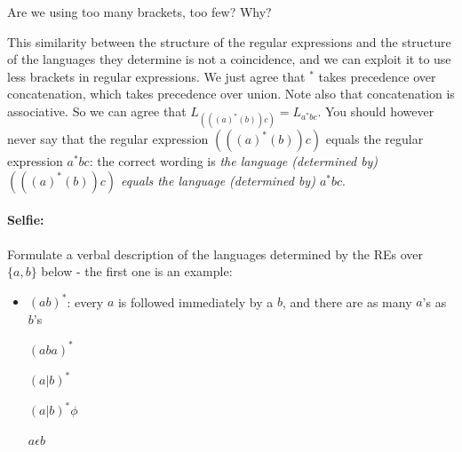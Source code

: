 Are we using too many brackets, too few? Why?




This similarity between the structure of the regular expressions and
the structure of the languages they determine is not a coincidence,
and we can exploit it to use less brackets in regular expressions. We
just agree that $^*$ takes precedence over concatenation, which takes
precedence over union. Note also that concatenation is associative. So
we can agree that $L_{(((a)^*(b))c)} = L_{a^*bc}$. You should however
never say that the regular expression $(((a)^*(b))c)$ equals the
regular expression $a^*bc$: the correct wording is {\em the language
(determined by) $(((a)^*(b))c)$ equals the language (determined by)
$a^*bc$}.

\paragraph{Selfie:}
Formulate a verbal description of the languages determined by the REs
over $\{a,b\}$ below - the first one is an example:

\begin{itemize}
\item[]
$(ab)^*$: every $a$ is followed immediately by a $b$, and there are as
many $a$'s as $b$'s

$(aba)^*$

$(a|b)^*$

$(a|b)^*\phi$

$a \epsilon b$
\end{itemize}


